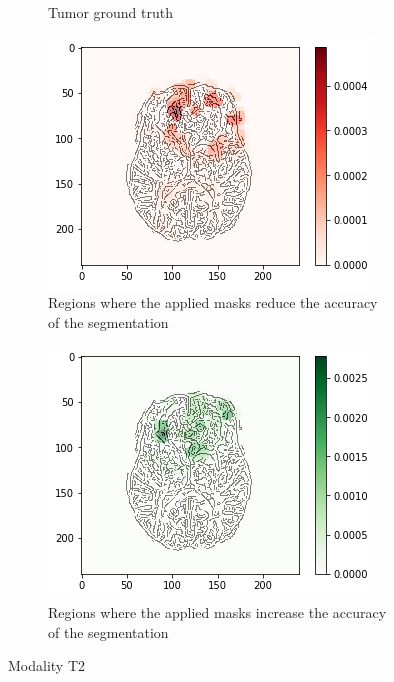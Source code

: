 \begin{figure}[H]
\begin{subfigure}[t]{.4\textwidth}
        \caption{Tumor ground truth}
    \end{subfigure}
    \begin{subfigure}[t]{.45\textwidth}
        \centering
        \includegraphics[width=\linewidth]{chapters/06_hdm/c_Brats18_2013_17_1_L1/53.png}
        \caption{Regions where the applied masks reduce the accuracy of the segmentation}
    \end{subfigure}\hspace{1cm}%
    \begin{subfigure}[t]{.45\textwidth}
        \centering
        \includegraphics[width=\linewidth]{chapters/06_hdm/c_Brats18_2013_17_1_L1/54.png}
        \caption{Regions where the applied masks increase the accuracy of the segmentation}
    \end{subfigure}
    \caption{Modality T2}
    \label{brats_201317_t2}
\end{figure}

